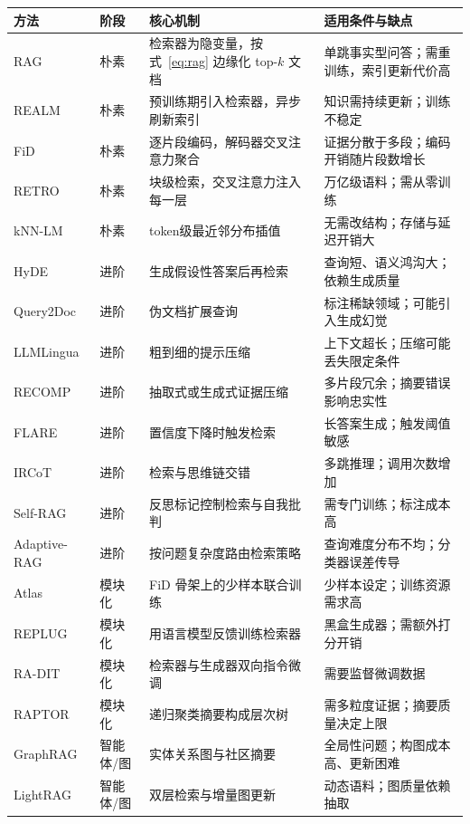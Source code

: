 \documentclass[10.5pt,compsoc,UTF8]{CjC}
\theoremstyle{mystyle}
\begin{document}
\renewcommand{\arraystretch}{1.25}
\begin{table}[H]
\vspace {-2.5mm}
\begin{center}
\begin{tabular}{p{22mm}p{27mm}p{50mm}p{55mm}}
\toprule
  方法 & 阶段 & 核心机制 & 适用条件与缺点\\
\hline
RAG & 朴素 & 检索器为隐变量，按式~\eqref{eq:rag} 边缘化 top-$k$ 文档 & 单跳事实型问答；需重训练，索引更新代价高 \\
REALM & 朴素 & 预训练期引入检索器，异步刷新索引 & 知识需持续更新；训练不稳定 \\
FiD & 朴素 & 逐片段编码，解码器交叉注意力聚合 & 证据分散于多段；编码开销随片段数增长 \\
RETRO & 朴素 & 块级检索，交叉注意力注入每一层 & 万亿级语料；需从零训练 \\
kNN-LM & 朴素 & token级最近邻分布插值 & 无需改结构；存储与延迟开销大 \\
HyDE & 进阶 & 生成假设性答案后再检索 & 查询短、语义鸿沟大；依赖生成质量 \\
Query2Doc & 进阶 & 伪文档扩展查询 & 标注稀缺领域；可能引入生成幻觉 \\
LLMLingua & 进阶 & 粗到细的提示压缩 & 上下文超长；压缩可能丢失限定条件 \\
RECOMP & 进阶 & 抽取式或生成式证据压缩 & 多片段冗余；摘要错误影响忠实性 \\
FLARE & 进阶 & 置信度下降时触发检索 & 长答案生成；触发阈值敏感 \\
IRCoT & 进阶 & 检索与思维链交错 & 多跳推理；调用次数增加 \\
Self-RAG & 进阶 & 反思标记控制检索与自我批判 & 需专门训练；标注成本高 \\
Adaptive-RAG & 进阶 & 按问题复杂度路由检索策略 & 查询难度分布不均；分类器误差传导 \\
Atlas & 模块化 & FiD 骨架上的少样本联合训练 & 少样本设定；训练资源需求高 \\
REPLUG & 模块化 & 用语言模型反馈训练检索器 & 黑盒生成器；需额外打分开销 \\
RA-DIT & 模块化 & 检索器与生成器双向指令微调 & 需要监督微调数据 \\
RAPTOR & 模块化 & 递归聚类摘要构成层次树 & 需多粒度证据；摘要质量决定上限 \\
GraphRAG & 智能体/图 & 实体关系图与社区摘要 & 全局性问题；构图成本高、更新困难 \\
LightRAG & 智能体/图 & 双层检索与增量图更新 & 动态语料；图质量依赖抽取 \\

\end{tabular}
\end{center}
\end{table}
\end{document}
